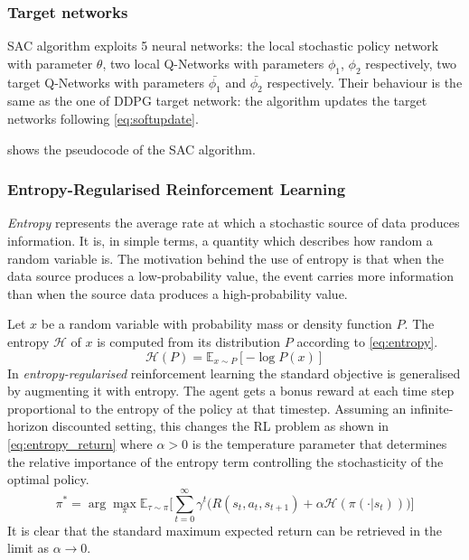 \subsubsection{Target networks}
SAC algorithm exploits 5 neural networks: the local stochastic policy network with parameter $\theta$, two local Q-Networks with parameters  $\phi_1$, $\phi_2$ respectively, two target Q-Networks with parameters $\bar{\phi_1}$ and $\bar{\phi_2}$ respectively.
Their behaviour is the same as the one of DDPG target network: the algorithm updates the target networks following \vref{eq:softupdate}.

 shows the pseudocode of the SAC algorithm.

\subsubsection{Entropy-Regularised Reinforcement Learning}

\textit{Entropy} represents the average rate at which a stochastic source of data produces information.
It is, in simple terms, a quantity which describes how random a random variable is.
The motivation behind the use of entropy is that when the data source produces a low-probability value, the event carries more information than when the source data produces a high-probability value.

Let $x$ be a random variable with probability mass or density function $P$.
The entropy $\mathcal{H}$ of $x$ is computed from its distribution $P$ according to \vref{eq:entropy}.
\begin{equation} \label{eq:entropy}
	\mathcal{H}(P) = \mathbb{E}_{x \sim P} [- \log P(x)]
\end{equation}
In \textit{entropy-regularised} reinforcement learning the standard objective is generalised by augmenting it with entropy.
The agent gets a bonus reward at each time step proportional to the entropy of the policy at that timestep.
Assuming an infinite-horizon discounted setting, this changes the RL problem as shown in \vref{eq:entropy_return} where $\alpha > 0$ is the temperature parameter that determines the relative importance of the entropy term controlling the stochasticity of the optimal policy.
\begin{equation} \label{eq:entropy_return}
	\pi^* = \arg \max_{\pi} \mathbb{E}_{\tau \sim \pi}\Bigg[\sum_{t=0}^{\infty} \gamma^t \bigg(R(s_t, a_t, s_{t+1}) + \alpha \mathcal{H}(\pi(\cdot|s_t))\bigg)\Bigg]
\end{equation}
It is clear that the standard maximum expected return can be retrieved in the limit as $\alpha \rightarrow 0$.

